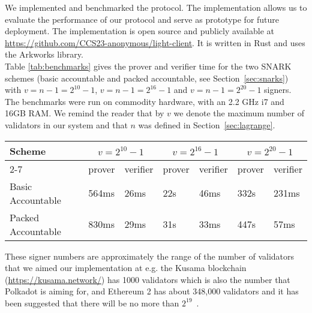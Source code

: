 \noindent We implemented and benchmarked the protocol. The implementation allows us to evaluate the performance of our protocol and serve as prototype for future deployment. The implementation 
is open source and publicly available at \url{https://github.com/CCS23-anonymous/light-client}. It is written in Rust and uses the Arkworks library. \\

\noindent Table \ref{tab:benchmarks} gives the prover and verifier time for the two SNARK schemes (basic accountable and  packed accountable, see Section~\ref{sec:snarks}) with $v = n-1 = 2^{10}-1$, $v = n-1 = 2^{16}-1$ 
and $v=n-1=2^{20}-1$ signers. The benchmarks were run on commodity hardware, with an 2.2 GHz i7 and 16GB RAM. We remind the reader that by $v$ we denote the maximum number of validators in our system and that $n$ was defined in Section~\ref{sec:lagrange}.\\

\begin{table*}[h!]
\hfill
\begin{tabular}{| l | l | l | l | l |l | l |}
\hline
 Scheme & \multicolumn{2}{|c|}{$v = 2^{10}-1$} & \multicolumn{2}{|c|}{$v = 2^{16}-1$} & \multicolumn{2}{|c|}{$v = 2^{20}-1$}     \\
\cline{2-7}
 &  prover & verifier & prover & verifier &  prover & verifier \\
\hline

Basic Accountable & 564ms & 26ms & 22s & 46ms & 332s & 231ms \\
Packed Accountable & 830ms & 29ms & 31s & 33ms & 447s & 57ms \\
\hline
\end{tabular}
\caption{Proof and verifier times for the different schemes and numbers of signers}
\label{tab:benchmarks}
\end{table*}

\noindent These signer numbers are approximately the range of the number of validators that we aimed our implementation at e.g. the Kusama blockchain (\url{https://kusama.network/}) has 1000 validators which is also the number that Polkadot is aiming for, and Ethereum 2 has about 348,000 validators and it has been suggested that there will be no more than $2^{19}$~\cite{ethresearch1}. \\

